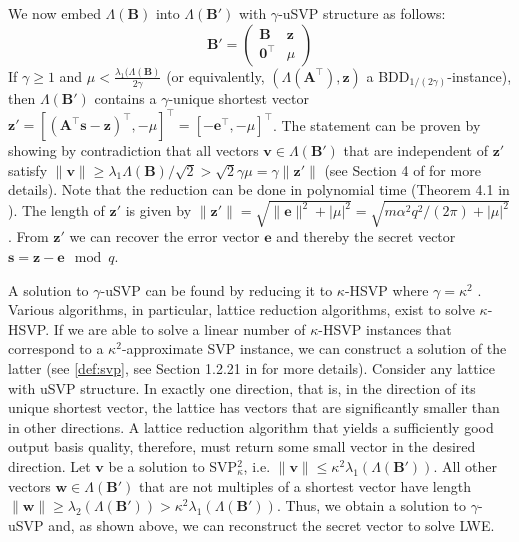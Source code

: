 We now embed $\Lambda(\mathbf{B})$ into $\Lambda(\mathbf{B}')$ with $\gamma$-uSVP structure as follows: %
\begin{equation}
  \mathbf{B}' = \begin{pmatrix}
    \mathbf{B}           & \mathbf{z} \\
    \mathbf{0}^\intercal & \mu
  \end{pmatrix}
\end{equation}
If $\gamma \geq 1$ and $\mu < \frac{\lambda_1(\Lambda(\mathbf{B})}{2\gamma}$ (or equivalently, $(\Lambda(\mathbf{A}^\intercal), \mathbf{z})$ a BDD$_{1/(2\gamma)}$-instance), then $\Lambda(\mathbf{B}')$ contains a $\gamma$-unique shortest vector $\mathbf{z}' = \left[(\mathbf{A}^\intercal\mathbf{s} - \mathbf{z})^\intercal, -\mu\right]^\intercal = \left[-\mathbf{e}^\intercal, -\mu\right]^\intercal$.
The statement can be proven by showing by contradiction that all vectors $\mathbf{v} \in \Lambda(\mathbf{B}')$ that are independent of $\mathbf{z}'$ satisfy $\| \mathbf{v}\| \geq \lambda_1{\Lambda(\mathbf{B})}/\sqrt{2} > \sqrt{2}\gamma \mu = \gamma \|\mathbf{z}'\|$ (see Section 4 of \cite{LM09} for more details). Note that the reduction can be done in polynomial time (Theorem 4.1 in \cite{LM09}). %
The length of $\mathbf{z}'$ is given by $\|\mathbf{z}'\| = \sqrt{\|\mathbf{e}\|^2 + | \mu |^2} = \sqrt{m\alpha^2 q^2/(2\pi) + | \mu |^2}$ \cite{BBGS19}. From $\mathbf{z}'$ we can recover the error vector $\mathbf{e}$ and thereby the secret vector $\mathbf{s} = \mathbf{z} - \mathbf{e} \mod q$.

A solution to $\gamma$-uSVP can be found by reducing it to $\kappa$-HSVP where $\gamma = \kappa^2$ \cite{APS15}. Various algorithms, in particular, lattice reduction algorithms, exist to solve $\kappa$-HSVP. If we are able to solve a linear number of $\kappa$-HSVP instances that correspond to a $\kappa^2$-approximate SVP instance, we can construct a solution of the latter (see \cref{def:svp}, see Section 1.2.21 in \cite{Lov87} for more details).
Consider any lattice with uSVP structure. In exactly one direction, that is, in the direction of its unique shortest vector, the lattice has vectors that are significantly smaller than in other directions. A lattice reduction algorithm that yields a sufficiently good output basis quality, therefore, must return some small vector in the desired direction.
Let $\mathbf{v}$ be a solution to SVP$_\kappa^2$, i.e. $\|\mathbf{v}\| \leq \kappa^2 \lambda_1(\Lambda(\mathbf{B}'))$. All other vectors $\mathbf{w}\in \Lambda(\mathbf{B}')$ that are not multiples of a shortest vector have length $\|\mathbf{w}\| \geq \lambda_2(\Lambda(\mathbf{B}')) > \kappa^2\lambda_1(\Lambda(\mathbf{B}'))$. Thus, we obtain a solution to $\gamma$-uSVP and, as shown above, we can reconstruct the secret vector to solve LWE.

